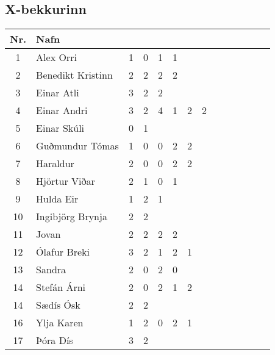 \subsection*{X-bekkurinn}

\begin{table}[H]
    \centering
    \begin{tabular}{|c|l|c|c|c|c|c|c|c|c|c|c|c|c|}
    \hline 
    \textbf{Nr.} & \textbf{Nafn} & \phantom{Mán} & \phantom{Mán} & \phantom{Mán} & \phantom{Mán} & \phantom{Mán} & \phantom{Mán} & \phantom{Mán} & \phantom{Mán} & \phantom{Mán} & \phantom{Mán} & \phantom{Mán} & \phantom{Mán} \\ \hline \hline
       1 & Alex Orri  & 1 & 0 & 1 & 1 & & & & & & & &  \\ \hline
       2 & Benedikt Kristinn & 2 & 2 & 2 & 2 & & & & & & &  &  \\ \hline
       3 & Einar Atli & 3 & 2 & 2 & & & & & & & & &  \\ \hline
       4 & Einar Andri & 3 & 2 & 4 & 1 & 2 & 2 & & & & &  & \\ \hline
       5 & Einar Skúli & 0 & 1 & & & & & & & & & & \\ \hline
       6 & Guðmundur Tómas & 1 & 0 & 0 & 2 & 2 & & & & & & &  \\ \hline
       7 & Haraldur & 2 & 0 & 0 & 2 & 2 & & & & & & & \\ \hline
       8 & Hjörtur Viðar & 2 & 1 & 0 & 1 & & & & & & & &  \\ \hline
       9 & Hulda Eir & 1 & 2 & 1 & & & & & & & & &  \\ \hline
       10 & Ingibjörg Brynja & 2 & 2 & & & & & & & & &  &  \\ \hline
       11 & Jovan & 2 & 2 & 2 & 2 & & & & & & & &  \\ \hline
       12 & Ólafur Breki & 3 & 2 & 1 & 2 & 1 & & & & & & &  \\ \hline
       13 & Sandra & 2 & 0 & 2 & 0 & & & & & & & &  \\ \hline
       14 & Stefán Árni & 2 & 0 & 2 & 1 & 2 & & & & & & &  \\ \hline
       14 & Sædís Ósk & 2  &  2 &  &  & & & & & & & & \\ \hline
       16 & Ylja Karen & 1 & 2 & 0 & 2 & 1 & & & & & & & \\ \hline
       17 & Þóra Dís & 3 & 2 & & & & & & & & &  &  \\ \hline
    \end{tabular}
\end{table}

